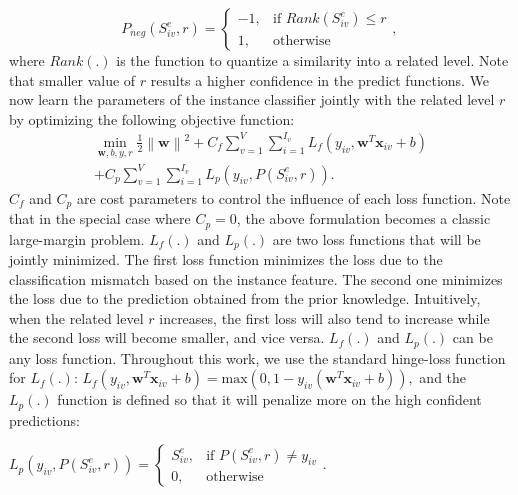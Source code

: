 \begin{equation}
\label{eq3}
P_{neg}(S_{iv}^{e},r) = 
\begin{cases}
-1,& \text{if } Rank(S_{iv}^{e}) \leq r \\
1,              & \text{otherwise}
\end{cases}\text{, }
\end{equation}
where $Rank(.)$ is the function to quantize a similarity into a related level. Note that smaller value of $r$ results a higher confidence in the predict functions. We now learn the parameters of the instance classifier jointly with the related level $r$ by optimizing the following objective function: 
\label{method}
\begin{equation}
\label{eq4}
\begin{split}
\min_{\textbf{w},b,y,r} \frac{1}{2} \left \| \textbf{w} \right \|^{2} + C_{f} \sum_{v=1}^{V}\sum_{i=1}^{I_{v}}L_{f}\left ( y_{iv}, \textbf{w}^{T}\textbf{x}_{iv}+b \right ) \\
+ C_{p} \sum_{v=1}^{V}\sum_{i=1}^{I_{v}}L_{p}\left ( y_{iv}, P(S_{iv}^{e},r) \right ).
\end{split}
\end{equation}
$C_{f}$ and $C_{p}$ are cost parameters to control the influence of each loss function. Note that in the special case where $C_{p}=0$, the above formulation becomes a classic large-margin problem. $L_{f}(.)$ and $L_{p}(.)$ are two loss functions that will be jointly minimized. The first loss function minimizes the loss due to the classification mismatch based on the instance feature. The second one minimizes the loss due to the prediction obtained from the prior knowledge. Intuitively, when the related level $r$ increases, the first loss will also tend to increase while the second loss will become smaller, and vice versa. $L_{f}(.)$ and $L_{p}(.)$ can be any loss function. Throughout this work, we use the standard hinge-loss function for $L_{f}(.)$: 
$L_{f}\left ( y_{iv},\textbf{w}^{T}\textbf{x}_{iv}+b \right )=\text{max}(0,1-y_{iv}(\textbf{w}^{T}\textbf{x}_{iv}+b)),$
and the $L_{p}(.)$ function is defined so that it will penalize more on the high confident predictions:

$L_{p}\left ( y_{iv}, P(S_{iv}^{e},r) \right )= 
\begin{cases}
S_{iv}^{e},& \text{if } P(S_{iv}^{e},r) \neq y_{iv} \\
0,              & \text{otherwise}
\end{cases}.$

